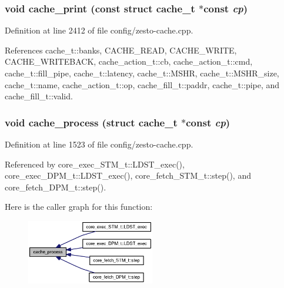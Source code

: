 \subsubsection[{cache\_\-print}]{\setlength{\rightskip}{0pt plus 5cm}void cache\_\-print (const struct {\bf cache\_\-t} $\ast$const  {\em cp})}\label{config_2zesto-cache_8cpp_5e18254876909dd853b5bdd65556188f}




Definition at line 2412 of file config/zesto-cache.cpp.

References cache\_\-t::banks, CACHE\_\-READ, CACHE\_\-WRITE, CACHE\_\-WRITEBACK, cache\_\-action\_\-t::cb, cache\_\-action\_\-t::cmd, cache\_\-t::fill\_\-pipe, cache\_\-t::latency, cache\_\-t::MSHR, cache\_\-t::MSHR\_\-size, cache\_\-t::name, cache\_\-action\_\-t::op, cache\_\-fill\_\-t::paddr, cache\_\-t::pipe, and cache\_\-fill\_\-t::valid.
\subsubsection[{cache\_\-process}]{\setlength{\rightskip}{0pt plus 5cm}void cache\_\-process (struct {\bf cache\_\-t} $\ast$const  {\em cp})}\label{config_2zesto-cache_8cpp_93ce14ef87e7565964216ea27d912147}




Definition at line 1523 of file config/zesto-cache.cpp.

Referenced by core\_\-exec\_\-STM\_\-t::LDST\_\-exec(), core\_\-exec\_\-DPM\_\-t::LDST\_\-exec(), core\_\-fetch\_\-STM\_\-t::step(), and core\_\-fetch\_\-DPM\_\-t::step().

Here is the caller graph for this function:\nopagebreak
\begin{figure}[H]
\begin{center}
\leavevmode
\includegraphics[width=158pt]{config_2zesto-cache_8cpp_93ce14ef87e7565964216ea27d912147_icgraph}
\end{center}
\end{figure}
